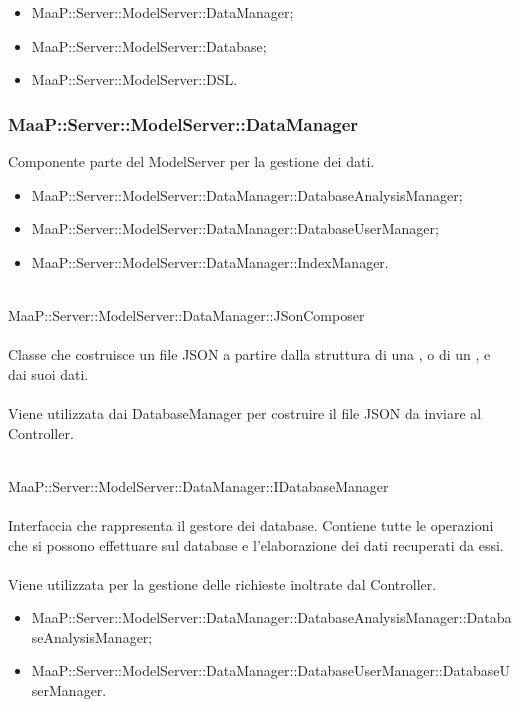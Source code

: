 \begin{itemize}
\item MaaP::Server::ModelServer::DataManager;
\item MaaP::Server::ModelServer::Database;
\item MaaP::Server::ModelServer::DSL.
\end{itemize}

\subsubsection{MaaP::Server::ModelServer::DataManager}
Componente parte del ModelServer per la gestione dei dati.
\begin{itemize}
\item MaaP::Server::ModelServer::DataManager::DatabaseAnalysisManager;
\item MaaP::Server::ModelServer::DataManager::DatabaseUserManager;
\item MaaP::Server::ModelServer::DataManager::IndexManager.
\end{itemize}

\\
MaaP::Server::ModelServer::DataManager::JSonComposer\\
\\
Classe che costruisce un file JSON a partire dalla struttura di una , o di un , e dai suoi dati.\\
\\
Viene utilizzata dai DatabaseManager per costruire il file JSON da inviare al Controller.

\\
MaaP::Server::ModelServer::DataManager::IDatabaseManager\\
\\
Interfaccia che rappresenta il gestore dei database. Contiene tutte le operazioni che si possono effettuare sul database e l'elaborazione dei dati recuperati da essi.\\
\\
Viene utilizzata per la gestione delle richieste inoltrate dal Controller.\\
\begin{itemize}
\item MaaP::Server::ModelServer::DataManager::DatabaseAnalysisManager::DatabaseAnalysisManager;
\item MaaP::Server::ModelServer::DataManager::DatabaseUserManager::DatabaseUserManager.
\end{itemize}

